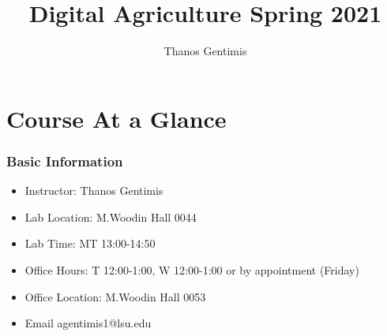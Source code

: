 \documentclass{beamer}
\title[Digital Ag]{Digital Agriculture Spring 2021} %
\author{Thanos Gentimis} %
\institute[LSU] %
{
Louisiana State University Ag. Center\\ %
\medskip
\textit{agentimis1@lsu.edu} %
}
\date{} %
\begin{document}
\begin{frame}
\titlepage %
\end{frame}



\section{Course At a Glance} %


\begin{frame}
\frametitle{Basic Information}
\begin{itemize}
\item Instructor: Thanos Gentimis
\item Lab Location: M.Woodin Hall 0044
\item Lab Time: MT 13:00-14:50
\item Office Hours: T 12:00-1:00, W 12:00-1:00 or by appointment (Friday)
\item Office Location: M.Woodin Hall 0053
\item Email agentimis1@lsu.edu
\end{itemize}


\end{frame}
\end{document}

